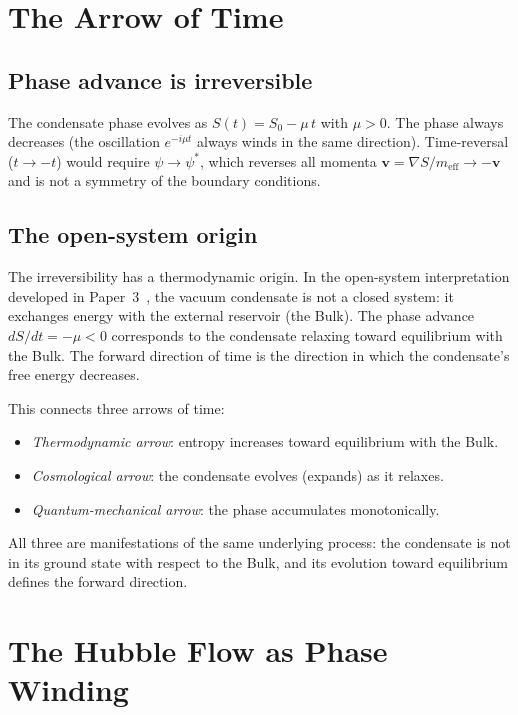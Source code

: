 \documentclass[12pt, a4paper]{article}
\newcommand{\meff}{m_{\mathrm{eff}}}
\begin{document}
\section{The Arrow of Time}
\label{sec:arrow}

\subsection{Phase advance is irreversible}

The condensate phase evolves as
$S(t) = S_0 - \mu\,t$ with $\mu > 0$.
The phase always decreases (the oscillation
$e^{-i\mu t}$ always winds in the same direction).
Time-reversal ($t \to -t$) would require
$\psi \to \psi^*$, which reverses all momenta
$\mathbf{v} = \nabla S/\meff \to -\mathbf{v}$ and
is not a symmetry of the boundary conditions.

\subsection{The open-system origin}

The irreversibility has a thermodynamic origin.
In the open-system interpretation developed in
Paper~3~\cite{kulangiev_2026c}, the vacuum
condensate is not a closed system: it exchanges
energy with the external reservoir (the Bulk).
The phase advance $dS/dt = -\mu < 0$ corresponds
to the condensate relaxing toward equilibrium with
the Bulk. The forward direction of time is the
direction in which the condensate's free energy
decreases.

This connects three arrows of time:
\begin{itemize}
\item \emph{Thermodynamic arrow}: entropy increases
  toward equilibrium with the Bulk.
\item \emph{Cosmological arrow}: the condensate
  evolves (expands) as it relaxes.
\item \emph{Quantum-mechanical arrow}: the phase
  accumulates monotonically.
\end{itemize}
All three are manifestations of the same underlying
process: the condensate is not in its ground state
with respect to the Bulk, and its evolution toward
equilibrium defines the forward direction.


\section{The Hubble Flow as Phase Winding}
\label{sec:hubble}
\end{document}

